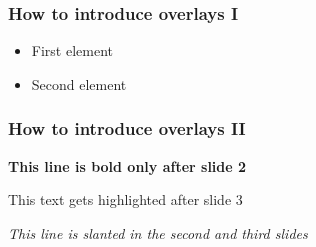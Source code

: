 \documentclass{beamer}
\begin{document}
\begin{frame}

  \frametitle{How to introduce overlays I}
  \begin{itemize}
    \pause
    \item First element
    \pause
    \item Second element
  \end{itemize}


\end{frame}

\begin{frame}
  \frametitle{How to introduce overlays II}


  \textbf<2->{This line is bold only after slide 2}
  
  
  \alert<3->{This text gets highlighted after slide 3}
  
  
    
  \textit<2-3>{This line is slanted in the second and third slides}
\end{frame}
\end{document}
